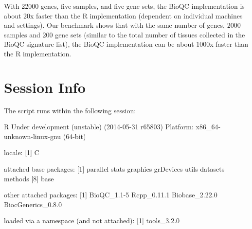 \documentclass[11pt]{article}
\begin{document}
With 22000 genes, five samples, and five gene sets, the BioQC implementation is about 20x faster than the R implementation (dependent on individual machines and settings). Our benchmark shows that with the same number of genes, 2000 samples and 200 gene sets (similar to the total number of tissues collected in the BioQC signature list), the BioQC implementation can be about 1000x faster than the R implementation.

\section{Session Info}
The script runs within the following session:
\begin{Schunk}
\begin{Soutput}
R Under development (unstable) (2014-05-31 r65803)
Platform: x86_64-unknown-linux-gnu (64-bit)

locale:
[1] C

attached base packages:
[1] parallel  stats     graphics  grDevices utils     datasets  methods  
[8] base     

other attached packages:
[1] BioQC_1.1-5        Rcpp_0.11.1        Biobase_2.22.0     BiocGenerics_0.8.0

loaded via a namespace (and not attached):
[1] tools_3.2.0
\end{Soutput}
\end{Schunk}
\end{document}
